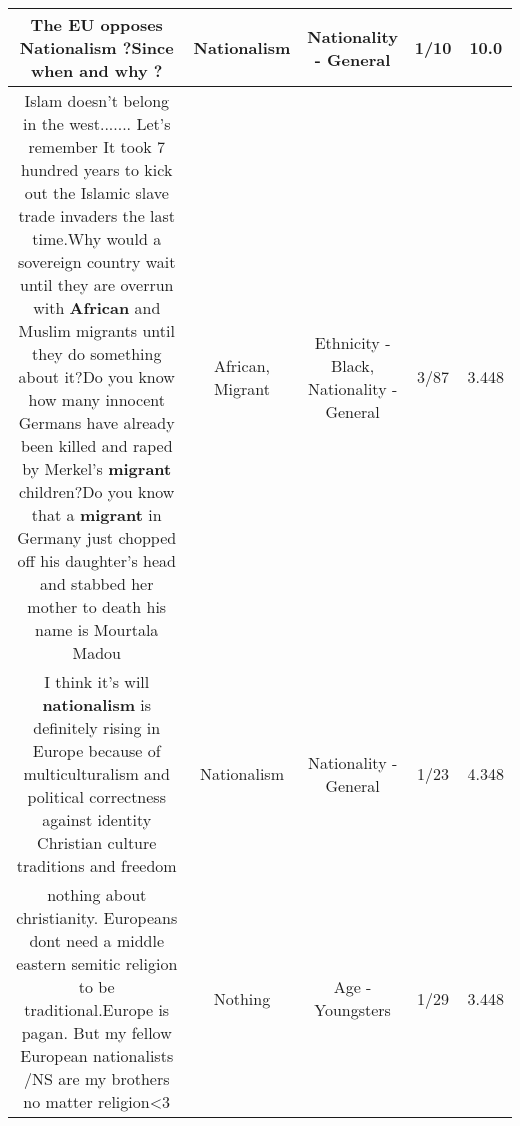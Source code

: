 \documentclass[11pt]{article}
\newlength\mylength
\begin{document}
\begin{center}
\begin{longtable}{|C{.65\mylength}|C{.30\mylength}|C{.12\mylength}|C{.12\mylength}|C{.12\mylength}|}
  \small The EU opposes \textbf{Nationalism} ?Since when and why ?\normalsize   & Nationalism & Nationality - General & 1/10 & 10.0 \\  \hline
  \small Islam doesn't belong in the west....... Let's remember It took 7 hundred years to kick out the Islamic slave trade invaders the last time.Why would a sovereign country wait until they are overrun with \textbf{African} and Muslim migrants until they do something about it?Do you know how many innocent Germans have already been killed and raped by Merkel's \textbf{migrant} children?Do you know that a \textbf{migrant} in Germany just chopped off his daughter's head and stabbed her mother to death his name is Mourtala Madou\normalsize   & African, Migrant & Ethnicity - Black, Nationality - General & 3/87 & 3.448 \\  \hline
  \small I think it's will \textbf{nationalism} is definitely rising in Europe because of multiculturalism and political correctness against identity Christian culture traditions and freedom\normalsize   & Nationalism & Nationality - General & 1/23 & 4.348 \\  \hline
  \small nothing about christianity. Europeans dont need a middle eastern semitic religion to be traditional.Europe is pagan. But my fellow European nationalists /NS are my brothers no matter religion<3\normalsize   & Nothing & Age - Youngsters & 1/29 & 3.448 \\  \hline

\end{longtable}
\end{center}
\end{document}
